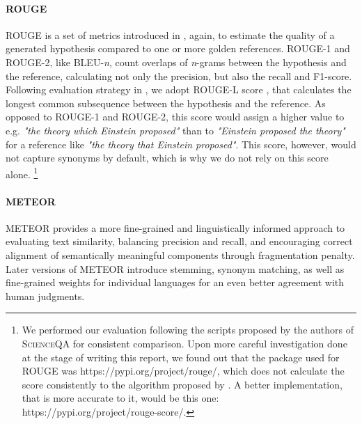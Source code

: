 \documentclass{article}
\begin{document}
\paragraph{ROUGE}
ROUGE is a set of metrics introduced in \cite{lin2004rouge}, again, to estimate the quality of a generated hypothesis compared to one or more golden references. 
ROUGE-1 and ROUGE-2, like BLEU-\textit{n}, count overlaps of \textit{n}-grams between the hypothesis and the reference, calculating not only the precision, but also the recall and F1-score.
Following evaluation strategy in \cite{lu2022learn}, we adopt ROUGE-L score \cite{lin2004rouge}, that calculates the longest common subsequence between the hypothesis and the reference. 
As opposed to ROUGE-1 and ROUGE-2, this score would assign a higher value to e.g. \textit{"the theory which Einstein proposed"} than to \textit{"Einstein proposed the theory" } for a reference like \textit{"the theory that Einstein proposed"}.
This score, however, would not capture synonyms by default, which is why we do not rely on this score alone. 
\footnote{We performed our evaluation following the scripts proposed by the authors of \textsc{ScienceQA} for consistent comparison. Upon more careful investigation done at the stage of writing this report, we found out that the package used for ROUGE was https://pypi.org/project/rouge/, which does not calculate the score consistently to the algorithm proposed by \cite{lin2004rouge}. A better implementation, that is more accurate to it, would be this one: https://pypi.org/project/rouge-score/.}


\paragraph{METEOR}
METEOR \cite{banerjee2005meteor} provides a more fine-grained and linguistically informed approach to evaluating text similarity, balancing precision and recall, and encouraging correct alignment of semantically meaningful components through fragmentation penalty.  
Later versions of METEOR introduce stemming, synonym matching, as well as fine-grained weights for individual languages for an even better agreement with human judgments.
\end{document}
